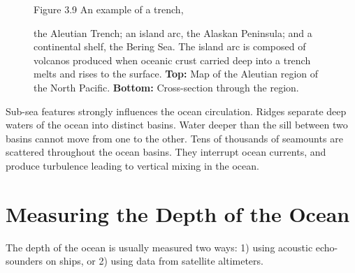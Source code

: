 \begin{figure}[t!]
\footnotesize
Figure 3.9 An example of a trench, \rule{0pt}{3ex}the Aleutian Trench;
an island arc, the Alaskan Peninsula; and a continental shelf, the
Bering Sea. The island arc is composed of volcanos produced when
oceanic crust carried deep into a trench melts and rises to the
surface. \textbf{Top:} Map of the Aleutian region of the North
Pacific. \textbf{Bottom:} Cross-section through the region.
\label{fig:aleutiantrench}
\vspace{-4ex}
\end{figure}

Sub-sea features strongly influences the ocean circulation.  Ridges
separate deep waters of the ocean into distinct basins. Water deeper
than the sill between two basins cannot move from one to
the other. Tens of thousands of seamounts are scattered throughout the
ocean basins. They interrupt ocean currents, and produce
turbulence leading to vertical
mixing in the ocean.

\section{Measuring the Depth of the Ocean}
The depth of the ocean is usually measured two ways: 1) using acoustic
echo-sounders on ships, or 2) using data from satellite altimeters.

